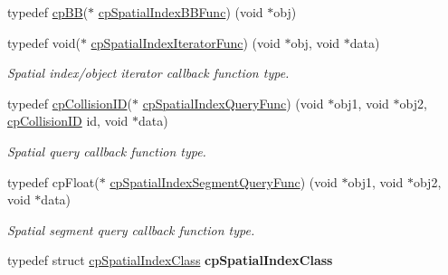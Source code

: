 \begin{DoxyCompactItemize}
\item 
typedef \hyperlink{structcpBB}{cp\+BB}($\ast$ \hyperlink{group__cpSpatialIndex_gaa8cf991cadcee1fbb6ee9379a0a6e0ea}{cp\+Spatial\+Index\+B\+B\+Func}) (void $\ast$obj)
\item 
\mbox{\label{group__cpSpatialIndex_ga522e250b59a1802d3648085685d41f97}} 
typedef void($\ast$ \hyperlink{group__cpSpatialIndex_ga522e250b59a1802d3648085685d41f97}{cp\+Spatial\+Index\+Iterator\+Func}) (void $\ast$obj, void $\ast$data)
\begin{DoxyCompactList}\small\item\em Spatial index/object iterator callback function type. \end{DoxyCompactList}\item 
\mbox{\label{group__cpSpatialIndex_ga7bcf80d017b29d32d9f8011405b241f9}} 
typedef \hyperlink{group__basicTypes_ga89d4043ca0567e947aaca19cf9600df5}{cp\+Collision\+ID}($\ast$ \hyperlink{group__cpSpatialIndex_ga7bcf80d017b29d32d9f8011405b241f9}{cp\+Spatial\+Index\+Query\+Func}) (void $\ast$obj1, void $\ast$obj2, \hyperlink{group__basicTypes_ga89d4043ca0567e947aaca19cf9600df5}{cp\+Collision\+ID} id, void $\ast$data)
\begin{DoxyCompactList}\small\item\em Spatial query callback function type. \end{DoxyCompactList}\item 
\mbox{\label{group__cpSpatialIndex_ga829ef5f6fd840ea31370d53db9045373}} 
typedef cp\+Float($\ast$ \hyperlink{group__cpSpatialIndex_ga829ef5f6fd840ea31370d53db9045373}{cp\+Spatial\+Index\+Segment\+Query\+Func}) (void $\ast$obj1, void $\ast$obj2, void $\ast$data)
\begin{DoxyCompactList}\small\item\em Spatial segment query callback function type. \end{DoxyCompactList}\item 
\mbox{\label{group__cpSpatialIndex_ga0e6be503abc1229a5da339a30ee6f88e}} 
typedef struct \hyperlink{structcpSpatialIndexClass}{cp\+Spatial\+Index\+Class} {\bfseries cp\+Spatial\+Index\+Class}
\item 
\mbox{\label{group__cpSpatialIndex_ga1af77c242def41e791d49350c809cc7f}} 

\end{DoxyCompactItemize}
